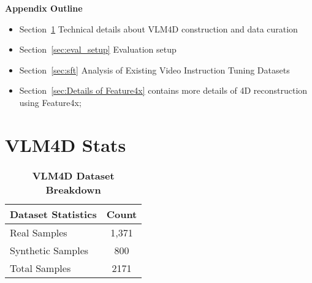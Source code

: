 \clearpage
\setcounter{page}{1}
\maketitlesupplementary


\renewcommand\thesection{\Alph{section}} %
\renewcommand\thesubsection{\thesection.\arabic{subsection}} %
\renewcommand\thefigure{\Alph{figure}} %
\renewcommand\thetable{\Alph{table}} %


\newcommand{\tabnohref}[1]{Tab.~{\color{red}#1}} %
\newcommand{\fignohref}[1]{Fig.~{\color{red}#1}} %
\newcommand{\secnohref}[1]{Sec.~{\color{red}#1}} %
\newcommand{\cnohref}[1]{[{\color{green}#1}]} %
\newcommand{\linenohref}[1]{Line~{\color{red}#1}}



\noindent \textbf{Appendix Outline}
\begin{itemize}[itemsep=0em]
    \item Section~\ref{sec:vlm4d_stats} Technical details about VLM4D construction and data curation 
    \item Section~\ref{sec:eval_setup} Evaluation setup 
    \item Section~\ref{sec:sft} Analysis of Existing Video Instruction Tuning Datasets
    \item Section~\ref{sec:Details of Feature4x} contains more details of 4D reconstruction using Feature4x;
\end{itemize}


\section{VLM4D Stats}
\label{sec:vlm4d_stats}
\begin{table}[h]
    \centering
    \begin{tabular}{|l|c|}
        \hline
        \textbf{Dataset Statistics} & \textbf{Count} \\
        \hline
        Real Samples & 1,371 \\
        Synthetic Samples & 800 \\
        Total Samples & 2171 \\
        \hline
    \end{tabular}
    \caption{\textbf{VLM4D Dataset Breakdown}}
    \label{tab:vlm4d_stats}
\end{table}

